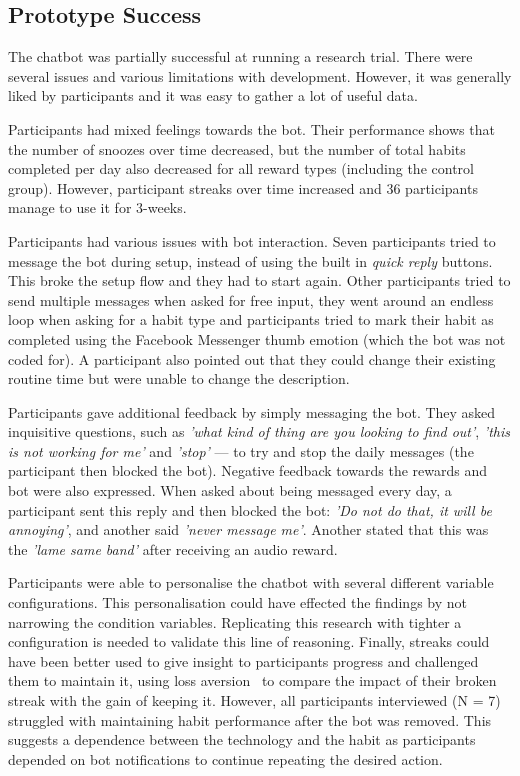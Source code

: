 \documentclass{scaffold/sigchi}
\begin{document}
\subsection{Prototype Success}
The chatbot was partially successful at running a research trial. There were several issues and various limitations with development. However, it was generally liked by participants and it was easy to gather a lot of useful data.

Participants had mixed feelings towards the bot. Their performance shows that the number of snoozes over time decreased, but the number of total habits completed per day also decreased for all reward types (including the control group). However, participant streaks over time increased and 36 participants manage to use it for 3-weeks.

Participants had various issues with bot interaction. Seven participants tried to message the bot during setup, instead of using the built in \textit{quick reply} buttons. This broke the setup flow and they had to start again. Other participants tried to send multiple messages when asked for free input, they went around an endless loop when asking for a habit type and participants tried to mark their habit as completed using the Facebook Messenger thumb emotion (which the bot was not coded for). A participant also pointed out that they could change their existing routine time but were unable to change the description.

Participants gave additional feedback by simply messaging the bot. They asked inquisitive questions, such as \textit{'what kind of thing are you looking to find out'}, \textit{'this is not working for me'} and \textit{'stop'} --- to try and stop the daily messages (the participant then blocked the bot). Negative feedback towards the rewards and bot were also expressed. When asked about being messaged every day, a participant sent this reply and then blocked the bot: \textit{'Do not do that, it will be annoying'}, and another said \textit{'never message me'}. Another stated that this was the \textit{'lame same band'} after receiving an audio reward.

Participants were able to personalise the chatbot with several different variable configurations. This personalisation could have effected the findings by not narrowing the condition variables. Replicating this research with tighter a configuration is needed to validate this line of reasoning. Finally, streaks could have been better used to give insight to participants progress and challenged them to maintain it, using loss aversion~\cite{loss_aversion} to compare the impact of their broken streak with the gain of keeping it. However, all participants interviewed (N = 7) struggled with maintaining habit performance after the bot was removed. This suggests a dependence between the technology and the habit as participants depended on bot notifications to continue repeating the desired action.
\end{document}
